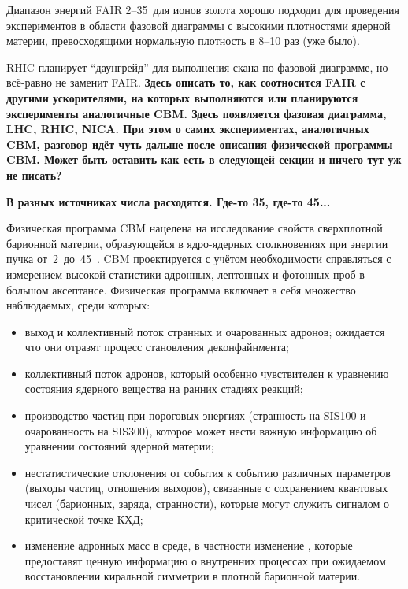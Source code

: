 Диапазон энергий FAIR 2--35~\GeVperNucl для ионов золота хорошо подходит для проведения экспериментов в области фазовой диаграммы с высокими плотностями ядерной материи, превосходящими нормальную плотность в 8--10 раз (уже было).


RHIC планирует ``даунгрейд'' для выполнения скана по фазовой диаграмме, но \todo всё-равно не заменит FAIR.
\todo \textbf{Здесь описать то, как соотносится FAIR с другими ускорителями, на которых выполняются или планируются эксперименты аналогичные CBM. Здесь появляется фазовая диаграмма, LHC, RHIC, NICA. При этом о самих экспериментах, аналогичных CBM, разговор идёт чуть дальше после описания физической программы CBM. Может быть оставить как есть в следующей секции и ничего тут уж не писать?}

\todo \textbf{В разных источниках числа расходятся. Где-то 35, где-то 45...}

Физическая программа CBM нацелена на исследование свойств сверхплотной барионной материи, образующейся в ядро-ядерных столкновениях при энергии пучка от~2~до~45~\GeVperNucl. CBM проектируется с учётом необходимости справляться с измерением высокой статистики адронных, лептонных и фотонных проб в большом аксептансе. Физическая программа включает в себя множество наблюдаемых, среди которых:

\begin{itemize}
\item выход и коллективный поток странных и очарованных адронов; ожидается что они отразят процесс становления деконфайнмента;
\item коллективный поток адронов, который особенно чувствителен к уравнению состояния ядерного вещества на ранних стадиях реакций;
\item производство частиц при пороговых энергиях (странность на SIS100 и очарованность на SIS300), которое может нести важную информацию об уравнении состояний ядерной материи;
\item нестатистические отклонения от события к событию различных параметров (выходы частиц, отношения выходов), связанные с сохранением квантовых чисел (барионных, заряда, странности), которые могут служить сигналом о критической точке КХД;
\item изменение адронных масс в среде, в частности изменение \todo, которые предоставят ценную информацию о внутренних процессах при ожидаемом восстановлении киральной симметрии в плотной барионной материи.
\end{itemize}

